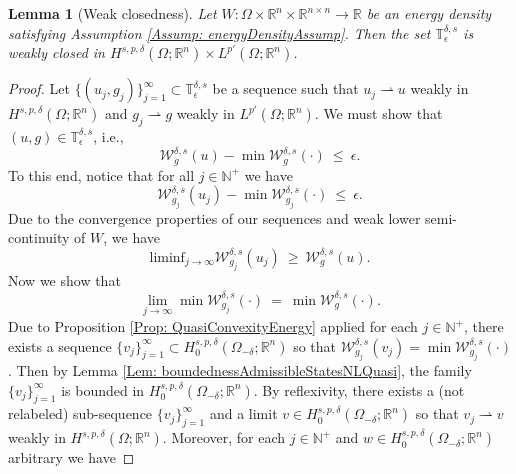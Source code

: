 \documentclass[10pt,a4paper]{amsart}
\newtheorem{lemma}{Lemma}
\def\N{\mathbb{N}}
\def\Om{\Omega}
\def\R{\mathbb{R}}
\def\de{\delta}
\def\ep{\epsilon}
\def\liminf{\text{liminf}}
\begin{document}
 \begin{lemma}[Weak closedness]\label{Lem: NLClosureOfMinimizationQuasi}
         Let $W: \Om \times \R^n \times \R^{n \times n} \rightarrow \R$ be an energy density satisfying Assumption \eqref{Assump: energyDensityAssump}. Then the set $\mathbb{T}^{\de, s}_{\ep}$ is weakly closed in $H^{s, p, \de}(\Om; \R^n) \times L^{p'}(\Om; \R^n)$.
    \end{lemma}

    \begin{proof}
    Let $\{(u_j, g_j)\}^{\infty}_{j = 1} \subset \mathbb{T}^{\de, s}_{\ep}$ be a sequence such that $u_j \rightharpoonup u$ weakly in $H^{s, p, \de}(\Om; \R^n)$ and $g_j \rightharpoonup g$ weakly in $L^{p'}(\Om; \R^n)$. We must show that $(u, g) \in \mathbb{T}^{\de, s}_{\ep}$, i.e.,
    \begin{equation}\label{Eq: NLClosureOfMinimizationQuasiEq1}
        \mathcal{W}^{\de, s}_g(u) - \min \mathcal{W}^{\de, s}_g(\cdot) \ \leq \ \ep.
    \end{equation}
    To this end, notice that for all $j \in \N^+$ we have
     \begin{equation}\label{Eq: NLClosureOfMinimizationQuasiEq2}
        \mathcal{W}^{\de, s}_{g_j}(u_j) - \min \mathcal{W}^{\de, s}_{g_j}(\cdot) \ \leq \ \ep.
    \end{equation}
    Due to the convergence properties of our sequences and weak lower semi-continuity of $W$, we have
    \begin{equation}\label{Eq: NLClosureOfMinimizationQuasiEq3}
        \liminf_{j \rightarrow \infty}\mathcal{W}^{\de, s}_{g_j}(u_j) \ \geq \  \mathcal{W}^{\de, s}_g(u).  
    \end{equation}
   Now we show that
 \begin{equation}\label{Eq: NLClosureOfMinimizationQuasiEq4}
        \lim_{j \rightarrow \infty}\min \mathcal{W}^{\de, s}_{g_j}(\cdot) \ = \ \min \mathcal{W}^{\de, s}_g(\cdot).
    \end{equation}
    Due to Proposition \ref{Prop: QuasiConvexityEnergy} applied for each $j \in \N^+$, there exists a sequence $\{v_j\}^{\infty}_{j = 1} \subset H^{s, p, \de}_0(\Om_{-\de}; \R^n)$ so that $\mathcal{W}^{\de,  s}_{g_j}(v_j) = \min\mathcal{W}^{\de, s}_{g_j}(\cdot)$. Then by Lemma \ref{Lem: boundednessAdmissibleStatesNLQuasi}, the family $\{v_j\}^{\infty}_{j = 1}$ is bounded in $H^{s, p, \de}_0(\Om_{-\de}; \R^n)$.  By reflexivity, there exists a (not relabeled) sub-sequence $\{v_j\}^{\infty}_{j = 1}$ and a limit $v \in H^{s, p, \de}_0(\Om_{-\de}; \R^n)$ so that $v_j \rightharpoonup v$ weakly in $H^{s, p, \de}(\Om; \R^n)$. Moreover, for each $j \in \N^+$ and $w \in H^{s, p, \de}_0(\Om_{-\de}; \R^n)$ arbitrary we have

\end{proof}
\end{document}
